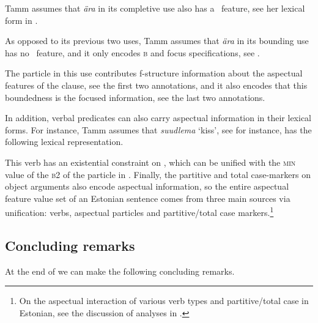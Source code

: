 \documentclass[output=paper,hidelinks]{langscibook}
\begin{document}
Tamm assumes that \textit{ära} in its completive use also has a \PRED\ feature, see her lexical form in  \citep[232]{Tamm2004a}.

\ea%
    \label{ex:FinnoUgric:13}
\z

As opposed to its previous two uses, Tamm assumes that \textit{ära} in its bounding use has no \PRED\ feature, and it only encodes \textsc{b} and focus specifications, see  \citep[229]{Tamm2004a}.

\ea%
\label{ex:FinnoUgric:14}
\z
The particle in this use contributes f-structure information about the aspectual features of the clause, see the first two annotations, and it also encodes that this boundedness is the focused information, see the last two annotations.

In addition, verbal predicates can also carry aspectual information in their lexical forms. For instance, Tamm assumes that \textit{suudlema} `kiss', see  for instance, has the following lexical representation.

\ea%
    \label{ex:FinnoUgric:15}
\z

This verb has an existential constraint on , which can be unified with the \textsc{min} value of the \textsc{b}2 of the particle in . Finally, the partitive and total case-markers on object arguments also encode aspectual information, so the entire aspectual feature value set of an Estonian sentence comes from three main sources via unification: verbs, aspectual particles and partitive/total case markers.\footnote{On the aspectual interaction of various verb types and partitive/total case in Estonian, see the discussion of  analyses in .}

\subsection{Concluding remarks}
\label{sec:FinnoUgric:3.3}
\largerpage
At the end of  we can make the following concluding remarks.
\end{document}
